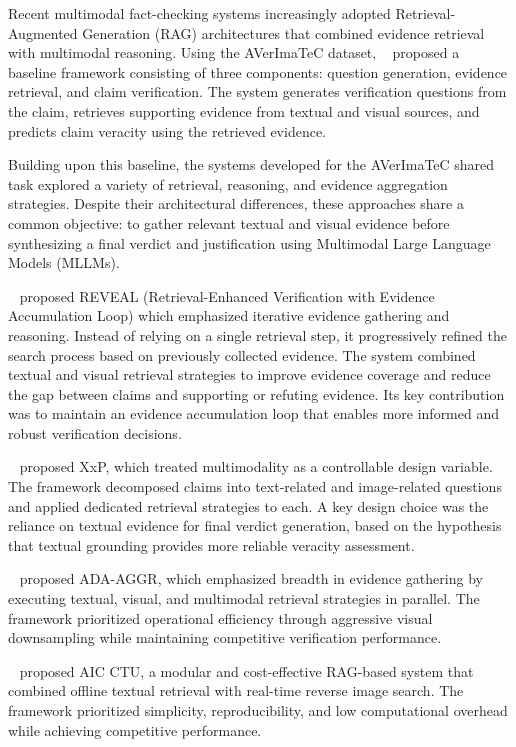 Recent multimodal fact-checking systems increasingly adopted Retrieval-Augmented Generation (RAG) architectures that combined evidence retrieval with multimodal reasoning. Using the AVerImaTeC dataset, ~\citet{Cao2025May} proposed a baseline framework consisting of three components: question generation, evidence retrieval, and claim verification. The system generates verification questions from the claim, retrieves supporting evidence from textual and visual sources, and predicts claim veracity using the retrieved evidence.

Building upon this baseline, the systems developed for the AVerImaTeC shared task explored a variety of retrieval, reasoning, and evidence aggregation strategies. Despite their architectural differences, these approaches share a common objective: to gather relevant textual and visual evidence before synthesizing a final verdict and justification using Multimodal Large Language Models (MLLMs).

~\citet{Tariq2026Mar} proposed REVEAL (Retrieval-Enhanced Verification with Evidence Accumulation Loop) which emphasized iterative evidence gathering and reasoning. Instead of relying on a single retrieval step, it progressively refined the search process based on previously collected evidence. The system combined textual and visual retrieval strategies to improve evidence coverage and reduce the gap between claims and supporting or refuting evidence. Its key contribution was to maintain an evidence accumulation loop that enables more informed and robust verification decisions.

~\citet{Tsoneva2026Mar} proposed XxP, which treated multimodality as a controllable design variable. The framework decomposed claims into text-related and image-related questions and applied dedicated retrieval strategies to each. A key design choice was the reliance on textual evidence for final verdict generation, based on the hypothesis that textual grounding provides more reliable veracity assessment.

~\citet{Upravitelev2026Mar} proposed ADA-AGGR, which emphasized breadth in evidence gathering by executing textual, visual, and multimodal retrieval strategies in parallel. The framework prioritized operational efficiency through aggressive visual downsampling while maintaining competitive verification performance.

~\citet{Ullrich2026Mar} proposed AIC CTU, a modular and cost-effective RAG-based system that combined offline textual retrieval with real-time reverse image search. The framework prioritized simplicity, reproducibility, and low computational overhead while achieving competitive performance.

